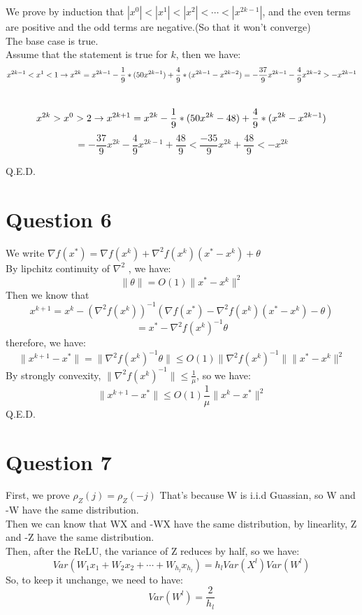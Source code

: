 \documentclass[a4 paper,12pt]{article}
\begin{document}
We prove by induction that $|x^0|<|x^1|<|x^2|<\cdots<|x^{2k-1}|$, and the
even terms are positive and the odd terms are negative.(So that it won't converge)\\
The base case is true.\\
Assume that the statement is true for $k$, then we have:\\
$$x^{2k-1}<x^1<1 \to x^{2k}=x^{2k-1}-\frac{1}{9}*(50x^{2k-1})+\frac{4}{9}*(x^{2k-1}-x^{2k-2})\\=-\frac{37}{9}
x^{2k-1}-\frac{4}{9}x^{2k-2}>-x^{2k-1}$$\\
$$x^{2k}>x^0>2 \to x^{2k+1}=x^{2k}-\frac{1}{9}*(50x^{2k}-48)+\frac{4}{9}*(x^{2k}-x^{2k-1})\\$$
$$=-\frac{37}{9}x^{2k}-\frac{4}{9}x^{2k-1}+\frac{48}{9}<\frac{-35}{9}x^{2k}+\frac{48}{9}<-x^{2k}$$

Q.E.D.
\section*{Question 6}
We write
$\nabla f(x^*)=\nabla f(x^k)+\nabla^2f(x^k)(x^*-x^k)+\theta$\\
By lipchitz continuity of $\nabla^2$ , we have:
\[ \|\theta\| = O(1) \|x^*-x^k\|^2 \]
Then we know that 
\[x^{k+1}=x^k-(\nabla^2f(x^k))^{-1}(\nabla f(x^*)-\nabla^2f(x^k)(x^*-x^k)-\theta)\]
\[=x^*-\nabla^2f(x^k)^{-1}\theta\]
therefore, we have:
\[\|x^{k+1}-x^*\|=\|\nabla^2f(x^k)^{-1}\theta\| \le O(1) \|\nabla^2f(x^k)^{-1}\|\|x^*-x^k\|^2\]
By strongly convexity, $\|\nabla^2f(x^k)^{-1}\|\le \frac{1}{\mu}$, so we have:
\[\|x^{k+1}-x^*\| \le O(1) \frac{1}{\mu}\|x^k-x^*\|^2\]
Q.E.D.
\section*{Question 7}
First, we prove $\rho_Z(j)=\rho_Z(-j)$
That's because W is i.i.d Guassian, so W and -W have the same distribution.\\
Then we can know that WX and -WX have the same distribution, by linearlity, Z and -Z have the same distribution.\\
Then, after the ReLU, the variance of Z reduces by half, so we have:
\[Var(W_1x_1+W_2x_2+\cdots+W_{h_l}x_{h_l})=h_l Var(X^l)Var(W^l)\]
So, to keep it unchange, we need to have:
\[Var(W^l)=\frac{2}{h_l}\]
\end{document}
